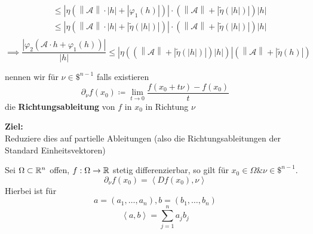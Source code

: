 \begin{proof*}
\begin{itemize}
\begin{align*}
				~ & \leq \left| \eta \left( \left\| \mathcal{A} \right\| \cdot \left| h \right| + \left| \varphi_1(h) \right|  \right)  \right| \cdot \left( \left\| \mathcal{A} \right\| + \left| \tilde \eta\left( \left| h \right|  \right)  \right| \right) \left| h \right| \\
				~ & \leq \left| \eta \left( \left\| \mathcal{A} \right\| \cdot \left| h \right| + \left| \tilde \eta \left( \left| h \right|  \right) \right|  \right)  \right| \cdot \left( \left\| \mathcal{A} \right\| + \left| \tilde \eta\left( \left| h \right|  \right)  \right| \right) \left| h \right| \\
			\end{align*}
			\[
				\implies \frac{ \left| \varphi_2\left( \mathcal{A} \cdot h + \varphi_1(h) \right) \right| }{ \left| h \right|  } \leq %
				\left|%
					\eta\left(%
						\left(
							\left\|
								\mathcal{A}
							\right\|
							+
							\left|
								\tilde\eta\left(\left| h \right| \right)
							\right|
						\right)
						\left| h \right|
					\right)
				\right|
				\left(
					\left\|
						\mathcal{A}
					\right\|
					+
					\left|
						\tilde\eta(h)
					\right|
				\right) 
			\]
			
	\end{itemize}
\end{proof*}

\begin{definition*}[4.23]
	nennen wir für $ \nu \in \mathdollar^{n - 1}  $ falls existieren
	\[
		\partial_\nu f(x_0) \coloneqq \lim_{t \to 0} \frac{ f(x_0 + t\nu) - f(x_0) }{ t } 
	\]
	die \textbf{Richtungsableitung} von $ f $ in $ x_0 $ in Richtung $ \nu $
\end{definition*}

\textbf{Ziel:}\\
Reduziere dies auf partielle Ableitungen
(also die Richtungsableitungen der Standard Einheitsvektoren)

\begin{theorem*}[4.24]
	Sei $ \Omega \subset \mathbb{R} ^n $ offen, $ f : \Omega \to \mathbb{R}  $ stetig differenzierbar,
	so gilt für $ x_0 \in \Omega \& \nu \in \mathdollar^{n - 1}  $.
	\[
		\partial_\nu f (x_0) = \left< Df(x_0), \nu \right>
	\]
	Hierbei ist für 
	\[
		a = (a_1, \dotsc, a_n), b = (b_1, \dotsc, b_n)
	\]
	\[
		\left< a, b \right> = \sum_{j=1}^{n} a_j b_j
	\]
	
\end{theorem*}


